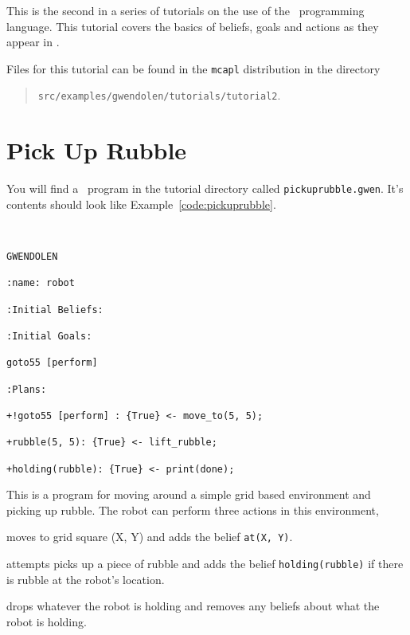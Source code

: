 \label{tutorial:gwendolen:bda}
This is the second in a series of tutorials on the use of the \gwendolen\ programming language.  This tutorial covers the basics of beliefs, goals and actions as they appear in \gwendolen.

Files for this tutorial can be found in the \texttt{mcapl} distribution in the directory 
\begin{quote}
\texttt{src/examples/gwendolen/tutorials/tutorial2}.
\end{quote}

\section{Pick Up Rubble}

\begin{sloppypar}
You will find a \gwendolen\ program in the tutorial directory called \texttt{pickuprubble.gwen}.  It's contents should look like Example~\ref{code:pickuprubble}.
\end{sloppypar}
\begin{ourexample}
\label{code:pickuprubble}\quad \\
\begin{lstlisting}[basicstyle=\sffamily,language=Gwendolen,style=easslisting]
GWENDOLEN

:name: robot

:Initial Beliefs:

:Initial Goals:

goto55 [perform]

:Plans:

+!goto55 [perform] : {True} <- move_to(5, 5);

+rubble(5, 5): {True} <- lift_rubble;

+holding(rubble): {True} <- print(done);
\end{lstlisting}
\end{ourexample}
This is a program for moving around a simple grid based environment and picking up rubble.  The robot can perform three actions in this environment, 
\begin{description}
\item[move\_to(X, Y)] moves to grid square (X, Y) and adds the belief \lstinline{at(X, Y)}.
\begin{sloppypar}
\item[lift\_rubble] attempts picks up a piece of rubble and adds the belief \lstinline{holding(rubble)} if there is rubble at the robot's location.
\end{sloppypar}
\item[drop] drops whatever the robot is holding and removes any beliefs about what the robot is holding.
\end{description}
